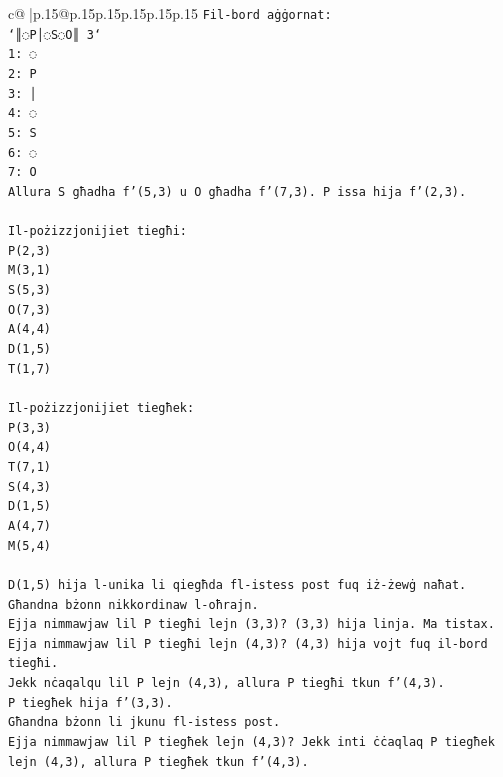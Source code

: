 \documentclass{article}
\begin{document}
{\begin{supertabular}{c@{$\;$}|p{.15\linewidth}@{}p{.15\linewidth}p{.15\linewidth}p{.15\linewidth}p{.15\linewidth}p{.15\linewidth}}
{{{\texttt{Fil{-}bord aġġornat:} \\
\texttt{`║◌P│◌S◌O║ 3`} \\
\texttt{1: ◌} \\
\texttt{2: P} \\
\texttt{3: │} \\
\texttt{4: ◌} \\
\texttt{5: S} \\
\texttt{6: ◌} \\
\texttt{7: O} \\
\texttt{Allura S għadha f'(5,3) u O għadha f'(7,3). P issa hija f'(2,3).} \\
\\ 
\texttt{Il{-}pożizzjonijiet tiegħi:} \\
\texttt{P(2,3)} \\
\texttt{M(3,1)} \\
\texttt{S(5,3)} \\
\texttt{O(7,3)} \\
\texttt{A(4,4)} \\
\texttt{D(1,5)} \\
\texttt{T(1,7)} \\
\\ 
\texttt{Il{-}pożizzjonijiet tiegħek:} \\
\texttt{P(3,3)} \\
\texttt{O(4,4)} \\
\texttt{T(7,1)} \\
\texttt{S(4,3)} \\
\texttt{D(1,5)} \\
\texttt{A(4,7)} \\
\texttt{M(5,4)} \\
\\ 
\texttt{D(1,5) hija l{-}unika li qiegħda fl{-}istess post fuq iż{-}żewġ naħat.} \\
\texttt{Għandna bżonn nikkordinaw l{-}oħrajn.} \\
\texttt{Ejja nimmawjaw lil P tiegħi lejn (3,3)? (3,3) hija linja. Ma tistax.} \\
\texttt{Ejja nimmawjaw lil P tiegħi lejn (4,3)? (4,3) hija vojt fuq il{-}bord tiegħi.} \\
\texttt{Jekk nċaqalqu lil P lejn (4,3), allura P tiegħi tkun f'(4,3).} \\
\texttt{P tiegħek hija f'(3,3).} \\
\texttt{Għandna bżonn li jkunu fl{-}istess post.} \\
\texttt{Ejja nimmawjaw lil P tiegħek lejn (4,3)? Jekk inti ċċaqlaq P tiegħek lejn (4,3), allura P tiegħek tkun f'(4,3).} \\
}}}
\end{supertabular}}
\end{document}
